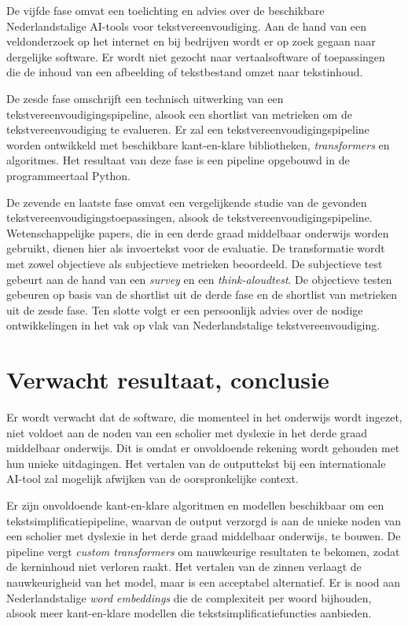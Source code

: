De vijfde fase omvat een toelichting en advies over de beschikbare Nederlandstalige AI-tools voor tekstvereenvoudiging. Aan de hand van een veldonderzoek op het internet en bij bedrijven wordt er op zoek gegaan naar dergelijke software. Er wordt niet gezocht naar vertaalsoftware of toepassingen die de inhoud van een afbeelding of tekstbestand omzet naar tekstinhoud.

De zesde fase omschrijft een technisch uitwerking van een tekstvereenvoudigingspipeline, alsook een shortlist van metrieken om de tekstvereenvoudiging te evalueren. Er zal een tekstvereenvoudigingspipeline worden ontwikkeld met beschikbare kant-en-klare bibliotheken, \textit{transformers} en algoritmes. Het resultaat van deze fase is een pipeline opgebouwd in de programmeertaal Python. 

De zevende en laatste fase omvat een vergelijkende studie van de gevonden tekstvereenvoudigingstoepassingen, alsook de tekstvereenvoudigingspipeline. Wetenschappelijke papers, die in een derde graad middelbaar onderwijs worden gebruikt, dienen hier als invoertekst voor de evaluatie. De transformatie wordt met zowel objectieve als subjectieve metrieken beoordeeld. De subjectieve test gebeurt aan de hand van een \textit{survey} en een \textit{think-aloudtest}. De objectieve testen gebeuren op basis van de shortlist uit de derde fase en de shortlist van metrieken uit de zesde fase. Ten slotte volgt er een persoonlijk advies over de nodige ontwikkelingen in het vak op vlak van Nederlandstalige tekstvereenvoudiging.

\section{Verwacht resultaat, conclusie}
\label{sec:verwachte_resultaten}

Er wordt verwacht dat de software, die momenteel in het onderwijs wordt ingezet, niet voldoet aan de noden van een scholier met dyslexie in het derde graad middelbaar onderwijs. Dit is omdat er onvoldoende rekening wordt gehouden met hun unieke uitdagingen. Het vertalen van de outputtekst bij een internationale AI-tool zal mogelijk afwijken van de oorspronkelijke context. 

Er zijn onvoldoende kant-en-klare algoritmen en modellen beschikbaar om een tekstsimplificatiepipeline, waarvan de output verzorgd is aan de unieke noden van een scholier met dyslexie in het derde graad middelbaar onderwijs, te bouwen. De pipeline vergt \textit{custom transformers} om nauwkeurige resultaten te bekomen, zodat de kerninhoud niet verloren raakt. Het vertalen van de zinnen verlaagt de nauwkeurigheid van het model, maar is een acceptabel alternatief. Er is nood aan Nederlandstalige \textit{word embeddings} die de complexiteit per woord bijhouden, alsook meer kant-en-klare modellen die tekstsimplificatiefuncties aanbieden.